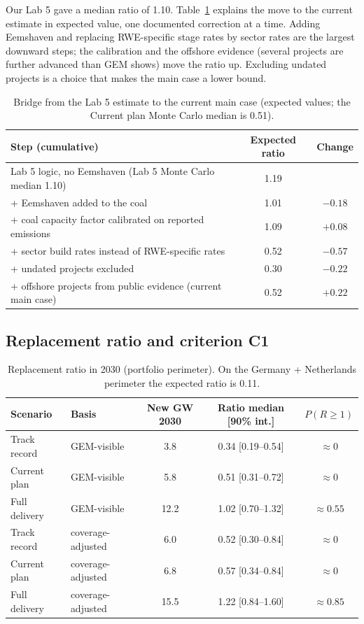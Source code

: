 \documentclass[11pt,a4paper]{article}
\begin{document}
Our Lab 5 gave a median ratio of 1.10. Table~\ref{tab:bridge} explains the move to the current estimate in expected value, one documented correction at a time. Adding Eemshaven and replacing RWE-specific stage rates by sector rates are the largest downward steps; the calibration and the offshore evidence (several projects are further advanced than GEM shows) move the ratio up. Excluding undated projects is a choice that makes the main case a lower bound.

\begin{table}[H]
\centering\small
\begin{tabular}{lcc}
\toprule
Step (cumulative) & Expected ratio & Change\\
\midrule
Lab 5 logic, no Eemshaven (Lab 5 Monte Carlo median 1.10) & 1.19 & \\
+ Eemshaven added to the coal & 1.01 & $-0.18$\\
+ coal capacity factor calibrated on reported emissions & 1.09 & $+0.08$\\
+ sector build rates instead of RWE-specific rates & 0.52 & $-0.57$\\
+ undated projects excluded & 0.30 & $-0.22$\\
+ offshore projects from public evidence (current main case) & 0.52 & $+0.22$\\
\bottomrule
\end{tabular}
\caption{Bridge from the Lab 5 estimate to the current main case (expected values; the Current plan Monte Carlo median is 0.51).}
\label{tab:bridge}
\end{table}

\subsection{Replacement ratio and criterion C1}
\begin{table}[H]
\centering\small
\begin{tabular}{llccc}
\toprule
Scenario & Basis & New GW 2030 & Ratio median [90\% int.] & $P(R\ge1)$\\
\midrule
Track record & GEM-visible & 3.8 & 0.34 [0.19--0.54] & $\approx0$\\
Current plan & GEM-visible & 5.8 & 0.51 [0.31--0.72] & $\approx0$\\
Full delivery & GEM-visible & 12.2 & 1.02 [0.70--1.32] & $\approx0.55$\\
Track record & coverage-adjusted & 6.0 & 0.52 [0.30--0.84] & $\approx0$\\
Current plan & coverage-adjusted & 6.8 & 0.57 [0.34--0.84] & $\approx0$\\
Full delivery & coverage-adjusted & 15.5 & 1.22 [0.84--1.60] & $\approx0.85$\\
\bottomrule
\end{tabular}
\caption{Replacement ratio in 2030 (portfolio perimeter). On the Germany + Netherlands perimeter the expected ratio is 0.11.}
\label{tab:scen}
\end{table}
\end{document}
